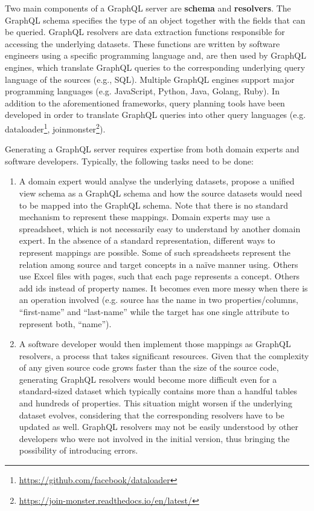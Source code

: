 Two main components of a GraphQL server are \textbf{schema} and \textbf{resolvers}. The GraphQL schema specifies the type of an object together with the fields that can be queried. GraphQL resolvers are data extraction functions responsible for accessing the underlying datasets. These functions are written by software engineers using a  specific programming language and, are then used by GraphQL engines, which translate GraphQL queries to the corresponding underlying query language of the sources (e.g., SQL). Multiple GraphQL engines support major programming languages (e.g. JavaScript, Python, Java, Golang, Ruby). In addition to the aforementioned frameworks, query planning tools have been developed in order to translate GraphQL queries into other query languages (e.g. dataloader\footnote{\url{https://github.com/facebook/dataloader}}, joinmonster\footnote{\url{https://join-monster.readthedocs.io/en/latest/}}).

Generating a GraphQL server requires expertise from both domain experts and software developers. Typically, the following tasks need to be done: 
\begin{enumerate}
    \item A domain expert would analyse the underlying datasets, propose a unified view schema as a GraphQL schema and how the source datasets would need to be mapped into the GraphQL schema. Note that there is no standard mechanism to represent these mappings. Domain experts may use a spreadsheet, which is not necessarily easy to understand by another domain expert. In the absence of a standard representation, different ways to represent mappings are possible. Some of such spreadsheets represent the relation among source and target concepts in a na\"ive manner using. Others use Excel files with pages, such that each page represents a concept. Others add ids instead of property names.
    It becomes even more messy when there is an operation involved (e.g. source has the name in two properties/columns, ``first-name'' and ``last-name'' while the target has one single attribute to represent both, ``name'').
    \item A software developer would then implement those mappings as GraphQL resolvers, a process that takes significant resources. Given that the complexity of any given source code grows faster than the size of the source code, generating GraphQL resolvers would become more difficult even for a standard-sized dataset which typically contains more than a handful tables and hundreds of properties. This situation might worsen if the underlying dataset evolves, considering that the corresponding resolvers have to be updated as well. GraphQL resolvers may not be easily understood by other developers who were not involved in the initial version, thus bringing the possibility of introducing errors.
\end{enumerate}

